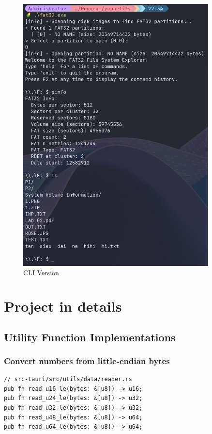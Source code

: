 \documentclass[a4paper,12pt]{report}
\begin{document}
\begin{figure}[!ht]
    \centering
    \includegraphics[width=0.9\textwidth]{../public/screenshots/cli.png}
    \caption{CLI Version}
\end{figure}

\pagebreak
\section{Project in details}
\subsection{Utility Function Implementations}
\subsubsection*{Convert numbers from little-endian bytes}
\begin{verbatim}
// src-tauri/src/utils/data/reader.rs
pub fn read_u16_le(bytes: &[u8]) -> u16;
pub fn read_u24_le(bytes: &[u8]) -> u32;
pub fn read_u32_le(bytes: &[u8]) -> u32;
pub fn read_u48_le(bytes: &[u8]) -> u64;
pub fn read_u64_le(bytes: &[u8]) -> u64;
\end{verbatim}
\end{document}
